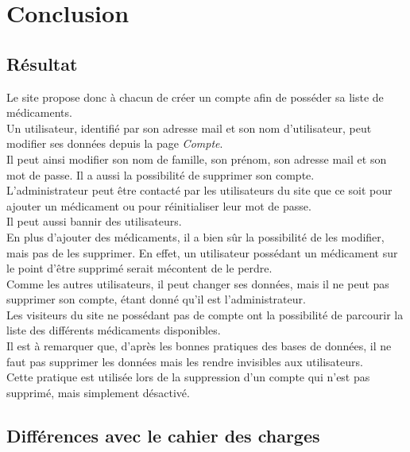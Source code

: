 \section{Conclusion}
\label{sec:conclusion}


\subsection{Résultat}
\label{sec:resultat}

Le site propose donc à chacun de créer un compte afin de posséder sa liste de médicaments.\\

Un utilisateur, identifié par son adresse mail et son nom d'utilisateur, peut modifier ses données depuis la page \textit{Compte}.\\
Il peut ainsi modifier son nom de famille, son prénom, son adresse mail et son mot de passe. Il a aussi la possibilité de supprimer son compte.\\

L'administrateur peut être contacté par les utilisateurs du site que ce soit pour ajouter un médicament ou pour réinitialiser leur mot de passe.\\ Il peut aussi bannir des utilisateurs.\\
En plus d'ajouter des médicaments, il a bien sûr la possibilité de les modifier, mais pas de les supprimer.
En effet, un utilisateur possédant un médicament sur le point d'être supprimé serait mécontent de le perdre.\\
Comme les autres utilisateurs, il peut changer ses données, mais il ne peut pas supprimer son compte, étant donné qu'il est l'administrateur.\\

Les visiteurs du site ne possédant pas de compte ont la possibilité de parcourir la liste des différents médicaments disponibles.\\

Il est à remarquer que, d'après les bonnes pratiques des bases de données, il ne faut pas supprimer les données mais les rendre invisibles aux utilisateurs.\\
Cette pratique est utilisée lors de la suppression d'un compte qui n'est pas supprimé, mais simplement désactivé.


\subsection{Différences avec le cahier des charges}
\label{sec:diff-cahier}

